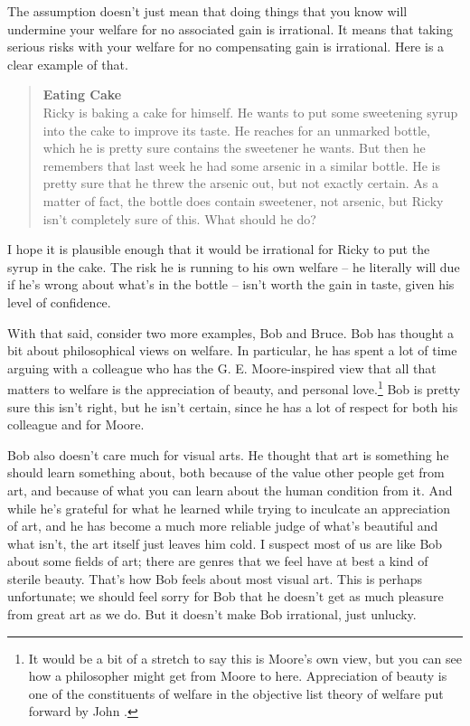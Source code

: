 The assumption doesn't just mean that doing things that you know will undermine your welfare for no associated gain is irrational. It means that taking serious risks with your welfare for no compensating gain is irrational. Here is a clear example of that.

\begin{quote}

\textbf{Eating Cake}\\
Ricky is baking a cake for himself. He wants to put some sweetening syrup into the cake to improve its taste. He reaches for an unmarked bottle, which he is pretty sure contains the sweetener he wants. But then he remembers that last week he had some arsenic in a similar bottle. He is pretty sure that he threw the arsenic out, but not exactly certain. As a matter of fact, the bottle does contain sweetener, not arsenic, but Ricky isn't completely sure of this. What should he do?
\end{quote}
I hope it is plausible enough that it would be irrational for Ricky to put the syrup in the cake. The risk he is running to his own welfare -- he literally will due if he's wrong about what's in the bottle -- isn't worth the gain in taste, given his level of confidence.

With that said, consider two more examples, Bob and Bruce. Bob has thought a bit about philosophical views on welfare. In particular, he has spent a lot of time arguing with a colleague who has the G. E. Moore-inspired view that all that matters to welfare is the appreciation of beauty, and personal love.\footnote{It would be a bit of a stretch to say this is Moore's own view, but you can see how a philosopher might get from Moore to here. Appreciation of beauty is one of the constituents of welfare in the objective list theory of welfare put forward by John  \citet[87--8]{Finnis2011}.} Bob is pretty sure this isn't right, but he isn't certain, since he has a lot of respect for both his colleague and for Moore. 

Bob also doesn't care much for visual arts. He thought that art is something he should learn something about, both because of the value other people get from art, and because of what you can learn about the human condition from it. And while he's grateful for what he learned while trying to inculcate an appreciation of art, and he has become a much more reliable judge of what's beautiful and what isn't, the art itself just leaves him cold. I suspect most of us are like Bob about some fields of art; there are genres that we feel have at best a kind of sterile beauty. That's how Bob feels about most visual art. This is perhaps unfortunate; we should feel sorry for Bob that he doesn't get as much pleasure from great art as we do. But it doesn't make Bob irrational, just unlucky.

